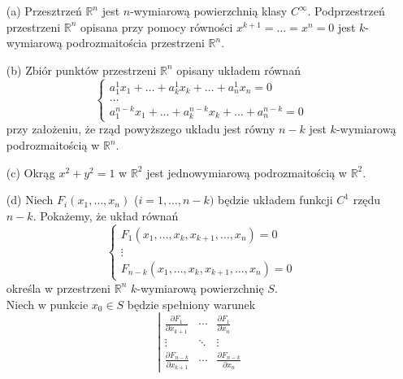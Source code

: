 \documentclass[leqno]{article}
\begin{document}
\begin{justify}
\begin{ex}
    \begin{itemize}
        \item [(a)]
            Przesztrzeń $\mathbb{R}^n$ jest $n$-wymiarową powierzchnią klasy $C^\infty$. Podprzestrzeń przestrzeni $\mathbb{R}^n$
            opisana przy pomocy równości $x^{k+1}=\ldots=x^n=0$ jest $k$-wymiarową podrozmaitościa przestrzeni $\mathbb{R}^n$.
        \item [(b)]
            Zbiór punktów przestrzeni $\mathbb{R}^n$ opisany układem równań
            \[
                \begin{cases}
                    a_1^1x_1 + \ldots + a^1_k x_k + \ldots + a^1_n x_n = 0 \\
                    \ldots \\ 
                    a_1^{n-k}x_1 + \ldots + a_k^{n-k}x_k + \ldots + a^{n-k}_n = 0
                \end{cases}
            \]
            przy założeniu, że rząd powyższego układu jest równy $n-k$ jest $k$-wymiarową podrozmaitością w $\mathbb{R}^n$.
        \item [(c)]
            Okrąg $x^2+y^2=1$ w $\mathbb{R}^2$ jest jednowymiarową podrozmaitością w $\mathbb{R}^2$.
        \item [(d)]
            Niech $F_i(x_1, \ldots, x_n)$ ($i = 1, \ldots, n-k)$ będzie układem funkcji $C^1$ rzędu $n-k$. Pokażemy, że układ równań
            \[
                \begin{cases}
                    F_1(x_1, \ldots, x_k, x_{k+1}, \ldots, x_n) = 0 \\
                    \vdots \\
                    F_{n - k}(x_1, \ldots, x_k, x_{k+1}, \ldots, x_n) = 0
                \end{cases}
            \]
            określa w przestrzeni $\mathbb{R}^n$ $k$-wymiarową powierzchnię $S$. \\
            Niech w punkcie $x_0 \in S$ będzie spełniony warunek 
            \setcounter{equation}{158}
            \begin{equation}\label{eq:159}
                \left|
                \begin{array}{ccc}
                    \frac{\partial F_1}{\partial x_{k+1}} & \cdots & \frac{\partial F_1}{\partial x_n} \\
                    \vdots & \ddots & \vdots \\
                    \frac{\partial F_{n-k}}{\partial x_{k+1}} & \cdots & \frac{\partial F_{n-k}}{\partial x_n}

\end{array}
\end{equation}
\end{itemize}
\end{ex}
\end{justify}
\end{document}
